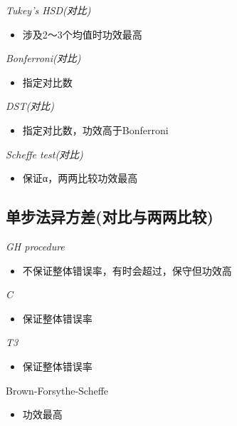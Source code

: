 \documentclass[]{tufte-book}
\providecommand{\tightlist}{%
  \setlength{\itemsep}{0pt}\setlength{\parskip}{0pt}}
\begin{document}
\emph{Tukey's HSD(对比)}

\begin{itemize}
\tightlist
\item
  涉及2～3个均值时功效最高
\end{itemize}

\emph{Bonferroni(对比)}

\begin{itemize}
\tightlist
\item
  指定对比数
\end{itemize}

\emph{DST(对比)}

\begin{itemize}
\tightlist
\item
  指定对比数，功效高于Bonferroni
\end{itemize}

\emph{Scheffe test(对比)}

\begin{itemize}
\tightlist
\item
  保证α，两两比较功效最高
\end{itemize}

\hypertarget{ux5355ux6b65ux6cd5ux5f02ux65b9ux5deeux5bf9ux6bd4ux4e0eux4e24ux4e24ux6bd4ux8f83}{%
\subsection{单步法异方差(对比与两两比较)}\label{ux5355ux6b65ux6cd5ux5f02ux65b9ux5deeux5bf9ux6bd4ux4e0eux4e24ux4e24ux6bd4ux8f83}}

\emph{GH procedure}

\begin{itemize}
\tightlist
\item
  不保证整体错误率，有时会超过，保守但功效高
\end{itemize}

\emph{C}

\begin{itemize}
\tightlist
\item
  保证整体错误率
\end{itemize}

\emph{T3}

\begin{itemize}
\tightlist
\item
  保证整体错误率
\end{itemize}

Brown-Forsythe-Scheffe

\begin{itemize}
\tightlist
\item
  功效最高
\end{itemize}
\end{document}
